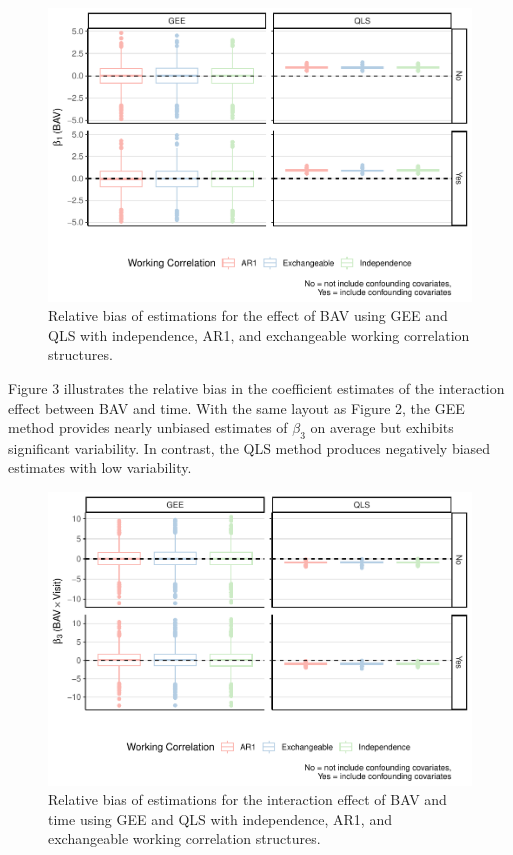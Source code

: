 \documentclass[
]{aft}
\begin{document}
\begin{figure}[H]

{\centering \includegraphics{FinalReport_files/figure-pdf/unnamed-chunk-7-1.pdf}

}

\caption{Relative bias of estimations for the effect of BAV using GEE
and QLS with independence, AR1, and exchangeable working correlation
structures.}

\end{figure}%

Figure 3 illustrates the relative bias in the coefficient estimates of
the interaction effect between BAV and time. With the same layout as
Figure 2, the GEE method provides nearly unbiased estimates of
\(\beta_3\) on average but exhibits significant variability. In
contrast, the QLS method produces negatively biased estimates with low
variability.

\begin{figure}[H]

{\centering \includegraphics{FinalReport_files/figure-pdf/unnamed-chunk-8-1.pdf}

}

\caption{Relative bias of estimations for the interaction effect of BAV
and time using GEE and QLS with independence, AR1, and exchangeable
working correlation structures.}

\end{figure}%
\end{document}
